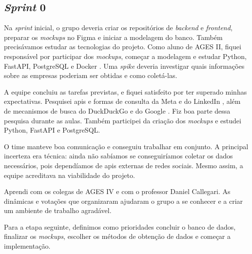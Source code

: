 \subsection{\textit{Sprint} 0}

Na \textit{sprint} inicial, o grupo deveria criar os repositórios de
\textit{backend} e \textit{frontend}, preparar os \textit{mockups} no Figma e
iniciar a modelagem do banco. Também precisávamos estudar as tecnologias do
projeto. Como aluno de AGES II, fiquei responsável por participar dos
\textit{mockups}, começar a modelagem e estudar Python, FastAPI, PostgreSQL e
Docker \cite{docker-docs}. Uma \textit{spike} deveria investigar quais informações
sobre as empresas poderiam ser obtidas e como coletá-las.

A equipe concluiu as tarefas previstas, e fiquei satisfeito por ter superado
minhas expectativas. Pesquisei \ac{api}s e formas de consulta da Meta
\cite{meta-graph-api} e do LinkedIn \cite{linkedin-api}, além de mecanismos de
busca do DuckDuckGo \cite{duckduckgo-answers} e do Google \cite{google-search-api}.
Fiz boa parte dessa pesquisa durante as aulas. Também participei da criação dos
\textit{mockups} e estudei Python, FastAPI e PostgreSQL.

O time manteve boa comunicação e conseguiu trabalhar em conjunto. A principal
incerteza era técnica: ainda não sabíamos se conseguiríamos coletar os dados
necessários, pois dependíamos de \ac{api}s externas de redes sociais. Mesmo
assim, a equipe acreditava na viabilidade do projeto.

Aprendi com os colegas de AGES IV e com o professor Daniel Callegari. As
dinâmicas e votações que organizaram ajudaram o grupo a se conhecer e a criar
um ambiente de trabalho agradável.

Para a etapa seguinte, definimos como prioridades concluir o banco de dados,
finalizar os \textit{mockups}, escolher os métodos de obtenção de dados e começar
a implementação.
